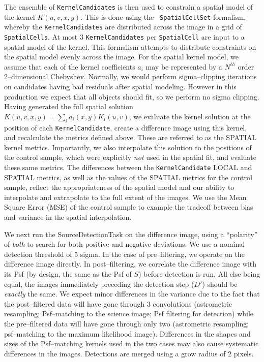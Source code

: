 \documentclass[prd, nofootinbib, floatfix, 11pt,tightenlines,times]{article}
\begin{document}
The ensemble of {\tt KernelCandidates} is then used to constrain a
spatial model of the kernel $K(u,v,x,y)$.  This is done using the {\tt
  SpatialCellSet} formalism, whereby the {\tt KernelCandidates} are
distributed across the image in a grid of {\tt SpatialCells}.  At most
3 {\tt KernelCandidates} per {\tt SpatialCell} are input to a spatial
model of the kernel.  This formalism attempts to distribute
constraints on the spatial model evenly across the image.  For the
spatial kernel model, we assume that each of the kernel coefficients
$a_i$ may be represented by a $N^{th}$ order 2--dimensional Chebyshev.
Normally, we would perform sigma--clipping iterations on candidates
having bad residuals after spatial modeling.  However in this
production we expect that all objects should fit, so we perform no
sigma clipping.  Having generated the full spatial solution
$K(u,v,x,y) = \sum_i a_i(x,y) K_i(u,v)$, we evaluate the kernel
solution at the position of each {\tt KernelCandidate}, create a
difference image using this kernel, and recalculate the metrics
defined above.  These are referred to as the SPATIAL kernel metrics.
Importantly, we also interpolate this solution to the positions of the
control sample, which were explicitly {\it not} used in the spatial
fit, and evaluate these same metrics.  The differences between the
{\tt KernelCandidate} LOCAL and SPATIAL metrics, as well as the values
of the SPATIAL metrics for the control sample, reflect the
appropriateness of the spatial model and our ability to interpolate
and extrapolate to the full extent of the images.  We use the Mean
Square Error (MSE) of the control sample to example the tradeoff
between bias and variance in the spatial interpolation.

We next run the SourceDetectionTask on the difference image, using a
``polarity'' of {\it both} to search for both positive and negative
deviations.  We use a nominal detection threshold of 5 sigma.  In the
case of pre--filtering, we operate on the difference image directly.
In post--filtering, we correlate the difference image with its Psf (by
design, the same as the Psf of $S$) before detection is run.  All else
being equal, the images immediately preceding the detection step
($D'$) should be {\it exactly} the same.  We expect minor differences
in the variance due to the fact that the post--filtered data will have
gone through 3 convolutions (astrometric resampling; Psf--matching to
the science image; Psf filtering for detection) while the
pre--filtered data will have gone through only two (astrometric
resampling; psf--matching to the maximum likelihood image).
Differences in the shapes and sizes of the Psf--matching kernels used
in the two cases may also cause systematic differences in the images.
Detections are merged using a grow radius of 2 pixels.
\end{document}
